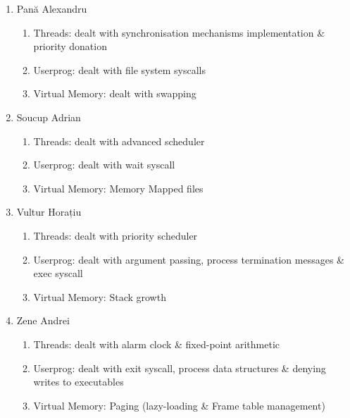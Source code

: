 \documentclass[a4paper,12pt]{report}
\begin{document}
\begin{enumerate}
	\item Pană Alexandru
	    \begin{enumerate}
	     \item Threads: dealt with synchronisation mechanisms implementation \& priority donation
	     \item Userprog: dealt with file system syscalls
	     \item Virtual Memory: dealt with swapping
	    \end{enumerate}

	\item Soucup Adrian
	    \begin{enumerate}
	     \item Threads: dealt with advanced scheduler
	     \item Userprog: dealt with wait syscall
	     \item Virtual Memory: Memory Mapped files
	    \end{enumerate}
	    
	\item Vultur Horațiu
	    \begin{enumerate}
	     \item Threads: dealt with priority scheduler
	     \item Userprog: dealt with argument passing, process termination messages \& exec syscall
	     \item Virtual Memory: Stack growth
	    \end{enumerate}

	\item Zene Andrei
	    \begin{enumerate}
	     \item Threads: dealt with alarm clock \& fixed-point arithmetic
	     \item Userprog: dealt with exit syscall, process data structures \& denying writes to executables
	     \item Virtual Memory: Paging (lazy-loading \& Frame table management)
	    \end{enumerate}
	   
\end{enumerate}














\end{document}
